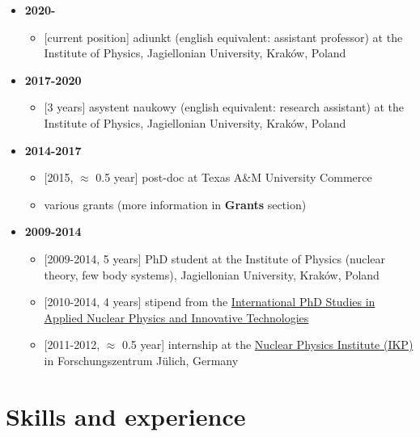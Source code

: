 \begin{itemize}
\tightlist
\item
  \textbf{2020-}

  \begin{itemize}
  \tightlist
  \item
    {[}current position{]} adiunkt (english equivalent: assistant
    professor) at the Institute of Physics, Jagiellonian University,
    Kraków, Poland
  \end{itemize}
\item
  \textbf{2017-2020}

  \begin{itemize}
  \tightlist
  \item
    {[}3 years{]} asystent naukowy (english equivalent: research
    assistant) at the Institute of Physics, Jagiellonian University,
    Kraków, Poland
  \end{itemize}
\item
  \textbf{2014-2017}

  \begin{itemize}
  \tightlist
  \item
    {[}2015, \(\approx\) 0.5 year{]} post-doc at Texas A\&M University
    Commerce
  \item
    various grants (more information in \textbf{Grants} section)
  \end{itemize}
\item
  \textbf{2009-2014}

  \begin{itemize}
  \tightlist
  \item
    {[}2009-2014, 5 years{]} PhD student at the Institute of Physics
    (nuclear theory, few body systems), Jagiellonian University, Kraków,
    Poland
  \item
    {[}2010-2014, 4 years{]} stipend from the
    \href{https://fais.uj.edu.pl/applied-nuclear-physics-and-innovative-technologies}{International
    PhD Studies in Applied Nuclear Physics and Innovative Technologies}
  \item
    {[}2011-2012, \(\approx\) 0.5 year{]} internship at the
    \href{https://www.fz-juelich.de/ikp/EN/Home/home_node.html}{Nuclear
    Physics Institute (IKP)} in Forschungszentrum Jülich, Germany
  \end{itemize}
\end{itemize}

\hypertarget{skills-and-experience}{%
\section{Skills and experience}\label{skills-and-experience}}

